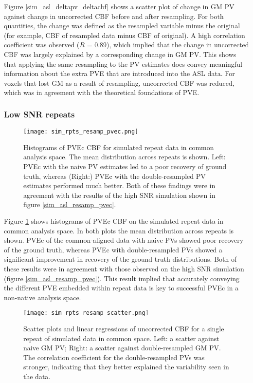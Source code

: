 Figure \ref{sim_asl_deltapv_deltacbf} shows a scatter plot of change in GM PV against change in uncorrected CBF before and after resampling. For both quantities, the change was defined as the resampled variable minus the original (for example, CBF of resampled data minus CBF of original). A high correlation coefficient was observed ($R$ = 0.89), which implied that the change in uncorrected CBF was largely explained by a corresponding change in GM PV. This shows that applying the same resampling to the PV estimates does convey meaningful information about the extra PVE that are introduced into the ASL data. For voxels that lost GM as a result of resampling, uncorrected CBF was reduced, which was in agreement with the theoretical foundations of PVE. 

\subsubsection{Low SNR repeats}

\begin{figure}[H]
\centering
\texttt{[image: sim\_rpts\_resamp\_pvec.png]}
\caption{Histograms of PVEc CBF for simulated repeat data in common analysis space. The mean distribution across repeats is shown. Left: PVEc with the naive PV estimates led to a poor recovery of ground truth, whereas (Right:) PVEc with the double-resampled PV estimates performed much better. Both of these findings were in agreement with the results of the high SNR simulation shown in figure \ref{sim_asl_resamp_pvec}.}
\label{sim_rpts_resamp_pvec}
\end{figure}

Figure \ref{sim_rpts_resamp_pvec} shows histograms of PVEc CBF on the simulated repeat data in common analysis space. In both plots the mean distribution across repeats is shown. PVEc of the common-aligned data with naive PVs showed poor recovery of the ground truth, whereas PVEc with double-resampled PVs showed a significant improvement in recovery of the ground truth distributions. Both of these results were in agreement with those observed on the high SNR simulation (figure \ref{sim_asl_resamp_pvec}). This result implied that accurately conveying the different PVE embedded within repeat data is key to successful PVEc in a non-native analysis space.  

\begin{figure}[H]
\centering
\texttt{[image: sim\_rpts\_resamp\_scatter.png]}
\caption{Scatter plots and linear regressions of uncorrected CBF for a single repeat of simulated data in common space. Left: a scatter against naive GM PV; Right: a scatter against double-resampled GM PV. The correlation coefficient for the double-resampled PVs was stronger, indicating that they better explained the variability seen in the data.}
\label{sim_rpts_resamp_scatter}
\end{figure}

